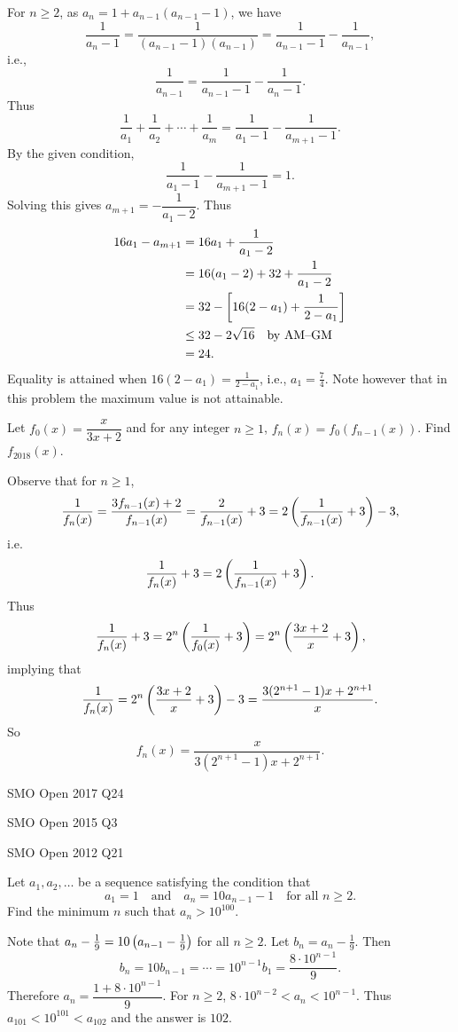 \begin{solution}
For $n\ge2$, as $a_n=1+a_{n-1}(a_{n-1}-1)$, we have
\[\frac{1}{a_n-1}=\frac{1}{(a_{n-1}-1)(a_{n-1})}=\frac{1}{a_{n-1}-1}-\frac{1}{a_{n-1}},\]
i.e.,
\[\frac{1}{a_{n-1}}=\frac{1}{a_{n-1}-1}-\frac{1}{a_n-1}.\]
Thus
\[\frac{1}{a_1}+\frac{1}{a_2}+\cdots+\frac{1}{a_m}=\frac{1}{a_1-1}-\frac{1}{a_{m+1}-1}.\]
By the given condition,
\[\frac{1}{a_1-1}-\frac{1}{a_{m+1}-1}=1.\]
Solving this gives $a_{m+1}=-\dfrac{1}{a_1-2}$. Thus
\begin{align*}
16a_1-a_{m+1}
&=16a_1+\frac{1}{a_1-2}\\
&=16(a_1-2)+32+\frac{1}{a_1-2}\\
&=32-\left[16(2-a_1)+\frac{1}{2-a_1}\right]\\
&\le32-2\sqrt{16}\quad\text{by AM--GM}\\
&=24.
\end{align*}
Equality is attained when $16(2-a_1)=\frac{1}{2-a_1}$, i.e., $a_1=\frac{7}{4}$. Note however that in this problem the maximum value is not attainable.
\end{solution}

\begin{prbm}
Let $f_0(x)=\dfrac{x}{3x+2}$ and for any integer $n\ge1$, $f_n(x)=f_0(f_{n-1}(x))$. Find $f_{2018}(x)$.
\end{prbm}

\begin{solution}
Observe that for $n\ge1$,
\[\frac{1}{f_n(x)}=\frac{3f_{n-1}(x)+2}{f_{n-1}(x)}=\frac{2}{f_{n-1}(x)}+3=2\left(\frac{1}{f_{n-1}(x)}+3\right)-3,\]
i.e.
\[\frac{1}{f_n(x)}+3=2\left(\frac{1}{f_{n-1}(x)}+3\right).\]
Thus
\[\frac{1}{f_n(x)}+3=2^n\left(\frac{1}{f_0(x)}+3\right)=2^n\left(\frac{3x+2}{x}+3\right),\]
implying that
\[\frac{1}{f_n(x)}=2^n\left(\frac{3x+2}{x}+3\right)-3=\frac{3(2^{n+1}-1)x+2^{n+1}}{x}.\]
So
\[f_n(x)=\frac{x}{3(2^{n+1}-1)x+2^{n+1}}.\]
\end{solution}

SMO Open 2017 Q24

SMO Open 2015 Q3

SMO Open 2012 Q21

\begin{prbm}
Let $a_1,a_2,\dots$ be a sequence satisfying the condition that
\[ a_1=1\quad\text{and}\quad a_n=10a_{n-1}-1 \quad \text{for all $n\ge2$}. \]
Find the minimum $n$ such that $a_n>10^{100}$.
\end{prbm}

\begin{solution}
Note that $a_n-\frac{1}{9}=10\left(a_{n-1}-\frac{1}{9}\right)$ for all $n\ge2$. Let $b_n=a_n-\frac{1}{9}$. Then
\[ b_n=10b_{n-1}=\cdots=10^{n-1}b_1=\frac{8\cdot10^{n-1}}{9}. \]
Therefore $a_n=\dfrac{1+8\cdot10^{n-1}}{9}$. For $n\ge2$, $8\cdot10^{n-2}<a_n<10^{n-1}$. Thus $a_{101}<10^{101}<a_{102}$ and the answer is $102$.
\end{solution}

